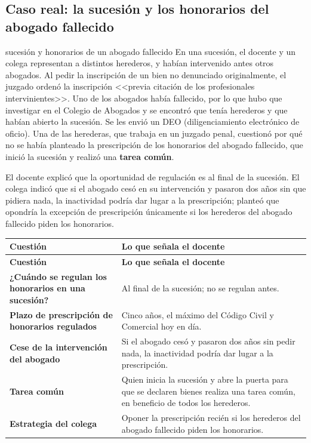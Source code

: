 \documentclass[12pt,oneside]{book}
\begin{document}
\subsection{Caso real: la sucesión y los honorarios del abogado fallecido}

\begin{example}{sucesión y honorarios de un abogado fallecido}
En una sucesión, el docente y un colega representan a distintos herederos, y habían intervenido antes otros abogados. Al pedir la inscripción de un bien no denunciado originalmente, el juzgado ordenó la inscripción <<previa citación de los profesionales intervinientes>>. Uno de los abogados había fallecido, por lo que hubo que investigar en el Colegio de Abogados y se encontró que tenía herederos y que habían abierto la sucesión. Se les envió un DEO (diligenciamiento electrónico de oficio). Una de las herederas, que trabaja en un juzgado penal, cuestionó por qué no se había planteado la prescripción de los honorarios del abogado fallecido, que inició la sucesión y realizó una \textbf{tarea común}.

El docente explicó que la oportunidad de regulación es al final de la sucesión. El colega indicó que si el abogado cesó en su intervención y pasaron dos años sin que pidiera nada, la inactividad podría dar lugar a la prescripción; planteó que opondría la excepción de prescripción únicamente si los herederos del abogado fallecido piden los honorarios.
\end{example}


\begin{longtable}{@{}L{0.38\textwidth}L{0.52\textwidth}@{}}
\toprule
\textbf{Cuestión} & \textbf{Lo que señala el docente} \\
\midrule
\endfirsthead
\toprule
\textbf{Cuestión} & \textbf{Lo que señala el docente} \\
\midrule
\endhead
\bottomrule
\endlastfoot
\textbf{¿Cuándo se regulan los honorarios en una sucesión?} & Al final de la sucesión; no se regulan antes. \\
\textbf{Plazo de prescripción de honorarios regulados} & Cinco años, el máximo del Código Civil y Comercial hoy en día. \\
\textbf{Cese de la intervención del abogado} & Si el abogado cesó y pasaron dos años sin pedir nada, la inactividad podría dar lugar a la prescripción. \\
\textbf{Tarea común} & Quien inicia la sucesión y abre la puerta para que se declaren bienes realiza una tarea común, en beneficio de todos los herederos. \\
\textbf{Estrategia del colega} & Oponer la prescripción recién si los herederos del abogado fallecido piden los honorarios. \\
\end{longtable}
\end{document}
